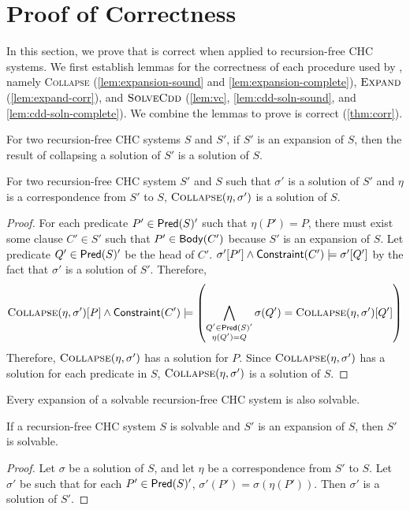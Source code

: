 \section{Proof of Correctness}
\label{app:corr}
%
In this section, we prove that \sys is correct when applied to
recursion-free CHC systems.
%
We first establish lemmas for the correctness of each procedure used
by \sys, namely \textsc{Collapse} (\autoref{lem:expansion-sound} and
\autoref{lem:expansion-complete}), $\textsc{Expand}$
(\autoref{lem:expand-corr}), and $\textsc{SolveCdd}$
(\autoref{lem:vc}, \autoref{lem:cdd-soln-sound}, and
\autoref{lem:cdd-soln-complete}).
%
We combine the lemmas to prove \sys is correct (\autoref{thm:corr}).

For two recursion-free CHC systems $S$ and $S'$, if $S'$ is
an expansion of $S$, then the result of collapsing a
solution of $S'$ is a solution of $S$.
%
\begin{lem}
  \label{lem:expansion-sound}
  For two recursion-free CHC system $S'$ and $S$ such that $\sigma'$
  is a solution of $S'$ and $\eta$ is a correspondence from
  $S'$ to $S$, $\textsc{Collapse}(\eta, \sigma')$ is a
  solution of $S$.
\end{lem}
%
\begin{proof}
  For each predicate $P' \in \mathsf{Pred}( S )'$ such that $\eta(P') = P$,
  there must exist some clause $C' \in S'$ such that $P' \in \mathsf{Body}(C')$
  because $S'$ is an expansion of $S$.
  Let predicate $Q' \in \mathsf{Pred}( S )'$ be the head of $C'$.
  $\sigma'[P'] \land \mathsf{Constraint}(C') \models \sigma'[Q']$ by
  the fact that $\sigma'$ is a solution of $S'$.
  Therefore,
  \[ \collapse{ \eta }{ \sigma' }[P] \land \consof{C'} \entails %
  \left( \bigland_{ \substack{Q' \in \predof{S}' \\ \eta(Q') = Q} }
  \sigma(Q') = %
  \collapse{\eta}{\sigma'}[Q'] \right)
  \]
  Therefore, $\textsc{Collapse}(\eta, \sigma')$ has a solution for $P$.
  Since $\textsc{Collapse}(\eta, \sigma')$ has a solution for each predicate
  in $S$, $\textsc{Collapse}(\eta, \sigma')$ is a solution of $S$.
\end{proof}

Every expansion of a solvable recursion-free CHC system is also
solvable.
\begin{lem}
  \label{lem:expansion-complete}
  If a recursion-free CHC system $S$ is solvable and
  $S'$ is an expansion of $S$, then $S'$ is solvable.
\end{lem}
%
\begin{proof}
  Let $\sigma$ be a solution of $S$, and let $\eta$ be a
  correspondence from $S'$ to $S$.
  Let $\sigma'$ be such that for each $P' \in \mathsf{Pred}( S )'$,
  $\sigma'(P') = \sigma(\eta(P'))$.
  Then $\sigma'$ is a solution of $S'$.
\end{proof}


